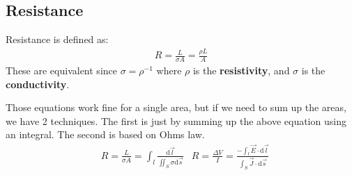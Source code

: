 \documentclass[12pt,letterpaper]{article} \usepackage{amsmath} \usepackage{graphicx} \usepackage[margin=1in]{geometry} \usepackage{longtable}  \usepackage{amssymb}
\begin{document}
	\subsection{Resistance}
	Resistance is defined as:
	\begin{align*}
		R = \frac{L}{\sigma A} = \frac{\rho L}{A}
	\end{align*}
	These are equivalent since $\sigma = \rho^{-1}$ where $\rho$ is the \textbf{resistivity}, and $\sigma$ is the \textbf{conductivity}.
	
	Those equations work fine for a single area, but if we need to sum up the areas, we have 2 techniques. The first is just by summing up the above equation using an integral. The second is based on Ohms law. 
	\begin{align*}
		 &R = \frac{L}{\sigma A} = \int_l \frac{\mathrm d \vec l}{\iint_S \sigma \mathrm d \vec s} &R = \frac{\Delta V}{I} = \frac{-\int_l \vec E \cdot \mathrm d \vec l}{\int_S \vec J \cdot \mathrm d \vec s} 
	\end{align*}
\end{document}

